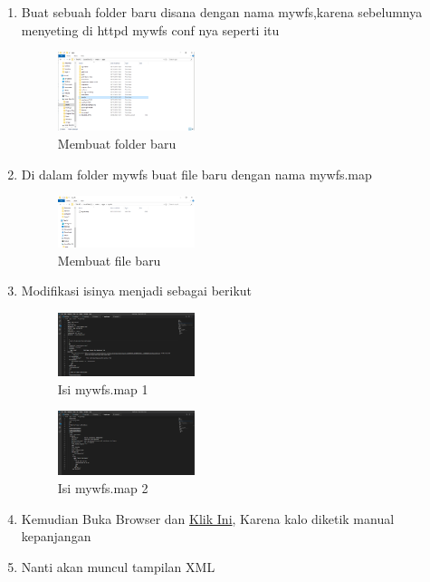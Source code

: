 \begin{enumerate}
  \item Buat sebuah folder baru disana dengan nama mywfs,karena sebelumnya menyeting di httpd mywfs conf nya seperti itu
  \hfill\break
    \begin{figure}[H]
		\includegraphics[width=4cm]{figures/1174039/tugas4/14.png}
		\centering
		\caption{Membuat folder baru}
    \end{figure}
  \item Di dalam folder mywfs buat file baru dengan nama mywfs.map
  \hfill\break
    \begin{figure}[H]
		\includegraphics[width=4cm]{figures/1174039/tugas4/15.png}
		\centering
		\caption{Membuat file baru}
    \end{figure}
  \item Modifikasi isinya menjadi sebagai berikut
  \hfill\break
    \begin{figure}[H]
		\includegraphics[width=4cm]{figures/1174039/tugas4/16.png}
		\centering
		\caption{Isi mywfs.map 1}
    \end{figure}
    \hfill\break
    \begin{figure}[H]
		\includegraphics[width=4cm]{figures/1174039/tugas4/17.png}
		\centering
		\caption{Isi mywfs.map 2}
    \end{figure}
  \item Kemudian Buka Browser dan \href{http://localhost:8080/cgi-bin/mapserv.exe?map=/ms4w/apps/mywfs/mywfs.map&SERVICE=WFS&VERSION=1.0.0&REQUEST=GetCapabilities}{Klik Ini}, Karena kalo diketik manual kepanjangan
  \item Nanti akan muncul tampilan XML

\end{enumerate}

